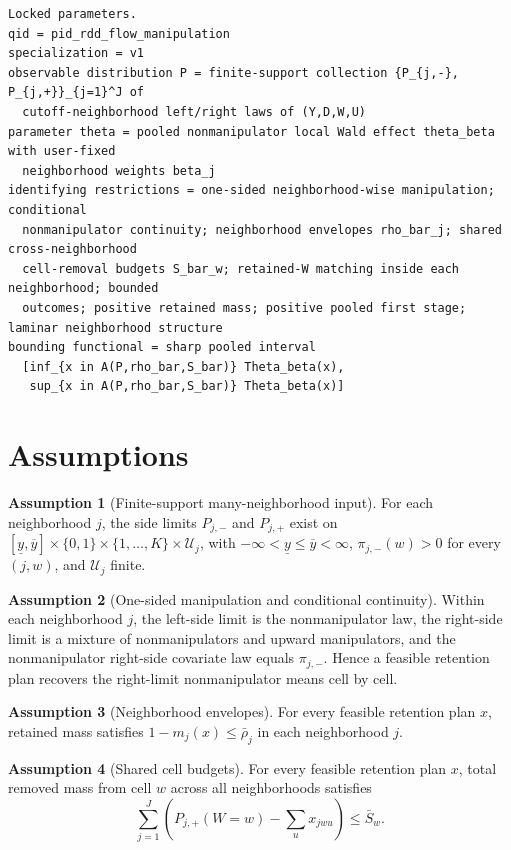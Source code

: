 \documentclass[11pt]{article}
\theoremstyle{definition}
\newtheorem{assumption}{Assumption}
\theoremstyle{plain}
\theoremstyle{remark}
\begin{document}
\begin{verbatim}
Locked parameters.
qid = pid_rdd_flow_manipulation
specialization = v1
observable distribution P = finite-support collection {P_{j,-}, P_{j,+}}_{j=1}^J of
  cutoff-neighborhood left/right laws of (Y,D,W,U)
parameter theta = pooled nonmanipulator local Wald effect theta_beta with user-fixed
  neighborhood weights beta_j
identifying restrictions = one-sided neighborhood-wise manipulation; conditional
  nonmanipulator continuity; neighborhood envelopes rho_bar_j; shared cross-neighborhood
  cell-removal budgets S_bar_w; retained-W matching inside each neighborhood; bounded
  outcomes; positive retained mass; positive pooled first stage; laminar neighborhood structure
bounding functional = sharp pooled interval
  [inf_{x in A(P,rho_bar,S_bar)} Theta_beta(x),
   sup_{x in A(P,rho_bar,S_bar)} Theta_beta(x)]
\end{verbatim}

\section{Assumptions}
\begin{assumption}[Finite-support many-neighborhood input]\label{ass:finite-support}
For each neighborhood \(j\), the side limits \(P_{j,-}\) and \(P_{j,+}\) exist on
\([\underline y,\overline y]\times\{0,1\}\times\{1,\ldots,K\}\times\mathcal U_j\), with
\(-\infty<\underline y\le \overline y<\infty\), \(\pi_{j,-}(w)>0\) for every \((j,w)\), and
\(\mathcal U_j\) finite.
\end{assumption}

\begin{assumption}[One-sided manipulation and conditional continuity]\label{ass:continuity}
Within each neighborhood \(j\), the left-side limit is the nonmanipulator law, the right-side
limit is a mixture of nonmanipulators and upward manipulators, and the nonmanipulator right-side
covariate law equals \(\pi_{j,-}\). Hence a feasible retention plan recovers the right-limit
nonmanipulator means cell by cell.
\end{assumption}

\begin{assumption}[Neighborhood envelopes]\label{ass:envelopes}
For every feasible retention plan \(x\), retained mass satisfies \(1-m_j(x)\le \bar\rho_j\) in
each neighborhood \(j\).
\end{assumption}

\begin{assumption}[Shared cell budgets]\label{ass:shared-caps}
For every feasible retention plan \(x\), total removed mass from cell \(w\) across all
neighborhoods satisfies
\[
  \sum_{j=1}^J \left(P_{j,+}(W=w)-\sum_u x_{jwu}\right)\le \bar S_w .
\]
\end{assumption}
\end{document}

